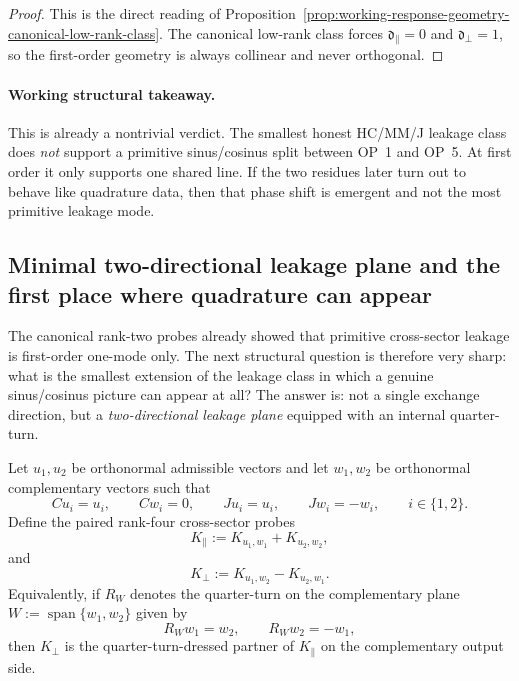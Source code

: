 \begin{proof}
This is the direct reading of Proposition~\ref{prop:working-response-geometry-canonical-low-rank-class}. The canonical low-rank class forces $\mathfrak d_{\parallel}=0$ and $\mathfrak d_{\perp}=1$, so the first-order geometry is always collinear and never orthogonal.
\end{proof}

\paragraph{Working structural takeaway.}
This is already a nontrivial verdict. The smallest honest HC/MM/J leakage class does \emph{not} support a primitive sinus/cosinus split between OP~1 and OP~5. At first order it only supports one shared line. If the two residues later turn out to behave like quadrature data, then that phase shift is emergent and not the most primitive leakage mode.

\subsection*{Minimal two-directional leakage plane and the first place where quadrature can appear}
The canonical rank-two probes already showed that primitive cross-sector leakage is first-order one-mode only. The next structural question is therefore very sharp: what is the smallest extension of the leakage class in which a genuine sinus/cosinus picture can appear at all? The answer is: not a single exchange direction, but a \emph{two-directional leakage plane} equipped with an internal quarter-turn.

\begin{definition}
\label{def:working-minimal-two-directional-leakage-plane}
Let $u_1,u_2$ be orthonormal admissible vectors and let $w_1,w_2$ be orthonormal complementary vectors such that
\[
  Cu_i=u_i,
  \qquad
  Cw_i=0,
  \qquad
  Ju_i=u_i,
  \qquad
  Jw_i=-w_i,
  \qquad i\in\{1,2\}.
\]
Define the paired rank-four cross-sector probes
\[
  K_{\parallel} := K_{u_1,w_1}+K_{u_2,w_2},
\]
and
\[
  K_{\perp} := K_{u_1,w_2}-K_{u_2,w_1}.
\]
Equivalently, if $R_W$ denotes the quarter-turn on the complementary plane $W:=\operatorname{span}\{w_1,w_2\}$ given by
\[
  R_W w_1=w_2,
  \qquad
  R_W w_2=-w_1,
\]
then $K_{\perp}$ is the quarter-turn-dressed partner of $K_{\parallel}$ on the complementary output side.
\end{definition}

